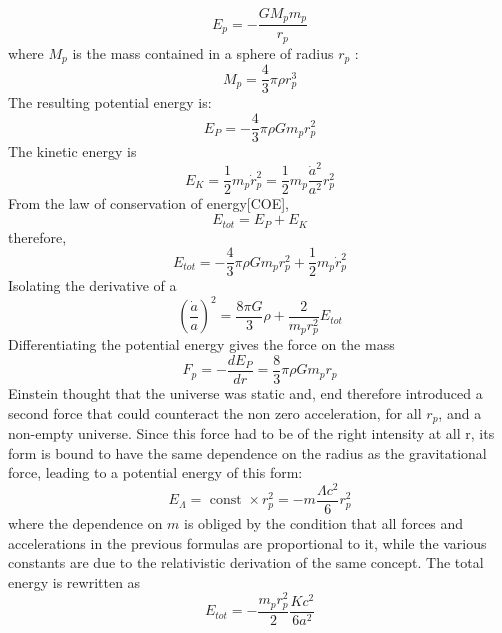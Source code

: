 \documentclass[12pt]{article}
\begin{document}
\begin{equation*}
E_{p}=-\frac{G M_{p} m_{p}}{r_{p}}
\end{equation*}
where $M_{p}$ is the mass contained in a sphere of radius $r_{p}$ :
\begin{equation*}
M_{p}=\frac{4}{3} \pi \rho r_{p}^{3}
\end{equation*}
The resulting potential energy is:
\begin{equation*}
E_{P}=-\frac{4}{3} \pi \rho G m_{p} r_{p}^{2}
\end{equation*}
The kinetic energy is 
\begin{equation*}
E_{K}=\frac{1}{2} m_{p} \dot{r}_{p}^{2}=\frac{1}{2} m_{p} \frac{\dot{a}^{2}}{a^{2}} r_{p}^{2}
\end{equation*} 
From the law of conservation of energy[COE],
\begin{equation*}
E_{t o t}=E_{P}+E_{K}
\end{equation*}
therefore,
\begin{equation*}
E_{t o t}=-\frac{4}{3} \pi \rho G m_{p} r_{p}^{2}+\frac{1}{2} m_{p} \dot{r}_{p}^{2}
\end{equation*}
Isolating the derivative of a
\begin{equation}
\left(\frac{\dot{a}}{a}\right)^{2}=\frac{8 \pi G}{3} \rho+\frac{2}{m_{p} r_{p}^{2}} E_{t o t}
\end{equation}
Differentiating the potential energy gives the force on the mass
\begin{equation}
F_{p}=-\frac{d E_{P}}{d r}=\frac{8}{3} \pi \rho G m_{p} r_{p}
\end{equation}
Einstein thought that the universe was static and, end therefore introduced a second force that could counteract the non zero acceleration, for all $r_{p}$, and a non-empty universe. Since this force had to be of the right intensity at all r, its form is bound to have the same dependence on the radius as the gravitational force, leading to a potential energy of this form:
\begin{equation}
E_{\Lambda}=\text { const } \times r_{p}^{2}=-m \frac{\Lambda c^{2}}{6} r_{p}^{2}
\end{equation}
where the dependence on $m$ is obliged by the condition that all forces and accelerations in the previous formulas are proportional to it, while the various constants are due to the relativistic derivation of the same concept. The total energy is rewritten as 
\begin{equation}
E_{t o t}=-\frac{m_{p} r_{p}^{2}}{2} \frac{K c^{2}}{6 a^{2}}
\end{equation}
\end{document}
